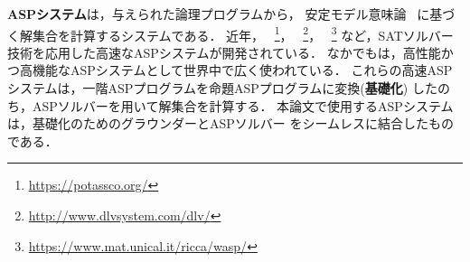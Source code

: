 
\textbf{ASPシステム}は，与えられた論理プログラムから，
安定モデル意味論~\cite{Gelfond88:iclp}
に基づく解集合を計算するシステムである．
近年，
{\clingo}~\footnote{\url{https://potassco.org/}}，
{\dlv}~\footnote{\url{http://www.dlvsystem.com/dlv/}}，
{\wasp}~\footnote{\url{https://www.mat.unical.it/ricca/wasp/}}
など，SATソルバー技術を応用した高速なASPシステムが開発されている．
なかでも{\clingo}は，高性能かつ高機能なASPシステムとして世界中で広く使われている．
これらの高速ASPシステムは，一階ASPプログラムを命題ASPプログラムに変換(\textbf{基礎化})
したのち，ASPソルバーを用いて解集合を計算する．
本論文で使用するASPシステム{\clingo}は，基礎化のためのグラウンダー{\gringo}とASPソルバー
{\clasp}をシームレスに結合したものである．

